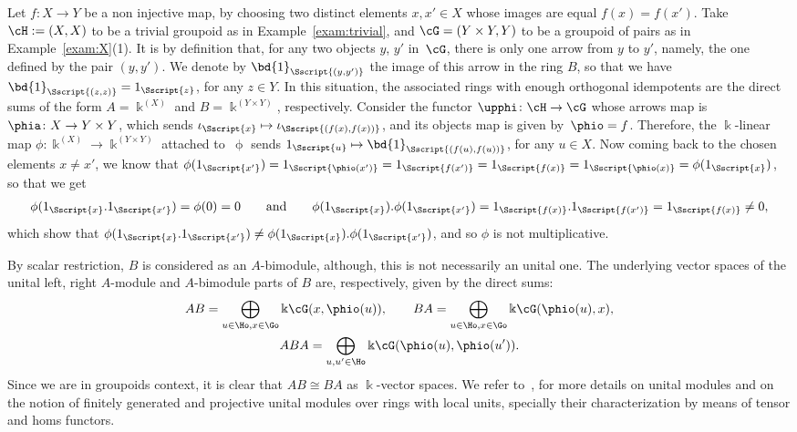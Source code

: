 \begin{Example}\label{exam:Phi} Let $f\colon X \to Y$ be a non injective map, by choosing two distinct elements $x, x' \in X$ whose images are equal $f(x)=f(x')$. Take $\cH:=(X,X)$ to be a trivial groupoid as in Example~\ref{exam:trivial}, and $\cG=(Y\times Y, Y)$ to be a groupoid of pairs as in Example~\ref{exam:X}(1). It is by definition that, for any two objects $y$, $y'$ in~$\cG$, there is only one arrow from $y$ to $y'$, namely, the one defined by the pair $(y,y')$. We denote by $\bd{1}_{\Sscript{(y, y')}}$ the image of this arrow in the ring $B$, so that we have $\bd{1}_{\Sscript{(z, z)}} = 1_{\Sscript{z}}$, for any $z \in Y$. In this situation, the associated rings with enough orthogonal idempotents are the direct sums of the form $A=\Bbbk^{(X)}$ and $B=\Bbbk^{(Y \times Y)}$, respectively. Consider the functor $\upphi\colon \cH \to \cG$ whose arrows map is $\phia\colon X \to Y \times Y$, which sends $\iota_{\Sscript{x}} \mapsto \iota_{\Sscript{(f(x), f(x))}}$, and its objects map is given by~$\phio=f$. Therefore, the $\Bbbk$-linear map $\phi\colon \Bbbk^{(X)} \to \Bbbk^{(Y \times Y)}$ attached to~$\upphi$ sends $1_{\Sscript{u}} \mapsto \bd{1}_{\Sscript{(f(u), f(u))}}$, for any $u \in X$. Now coming back to the chosen elements $x\neq x'$, we know that $\phi(1_{\Sscript{x'}}) = 1_{\Sscript{\phio(x')}}=1_{\Sscript{f(x')}}= 1_{\Sscript{f(x)}}=1_{\Sscript{\phio(x)}} =\phi(1_{\Sscript{x}})$, so that we get
\begin{gather*}
\phi( 1_{\Sscript{x}} . 1_{\Sscript{x'}}) = \phi(0) = 0 \qquad \text{and} \qquad \phi( 1_{\Sscript{x}}) . \phi(1_{\Sscript{x'}}) =1_{\Sscript{f(x)}} . 1_{\Sscript{f(x')}} =1_{\Sscript{f(x)}} \neq 0,
\end{gather*}
which show that $\phi( 1_{\Sscript{x}} . 1_{\Sscript{x'}}) \neq \phi( 1_{\Sscript{x}}) . \phi(1_{\Sscript{x'}})$, and so $\phi$ is not multiplicative.
\end{Example}

By scalar restriction, $B$ is considered as an $A$-bimodule, although, this is not necessarily an unital one. The underlying vector spaces of the unital left, right $A$-module and $A$-bimodule parts of $B$ are, respectively, given by the direct sums:
\begin{gather*}
AB = \bigoplus_{u \in \Ho, x \in \Go} \Bbbk \cG(x, \phio(u)),\qquad BA = \bigoplus_{u \in \Ho, x \in \Go} \Bbbk \cG(\phio(u), x), \nonumber\\
ABA = \bigoplus_{u, u' \in \Ho} \Bbbk \cG(\phio(u),\phio(u')).%
\end{gather*}
Since we are in groupoids context, it is clear that $AB \cong BA$ as $\Bbbk$-vector spaces. We refer to~\cite{ElKaoutit:2009}, for more details on unital modules and on the notion of finitely generated and projective unital modules over rings with local units, specially their characterization by means of tensor and homs functors.

